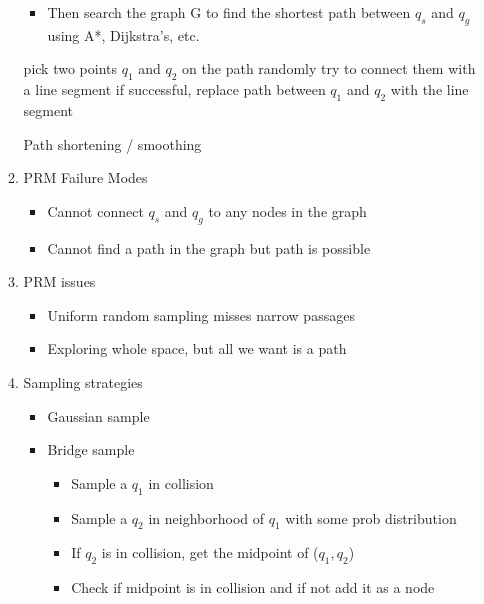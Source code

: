 \documentclass[../main.tex]{subfiles}
\begin{document}
\begin{itemize}
\begin{enumerate}
\begin{itemize}
                \item Then search the graph G to find the shortest path between $q_{s}$ and $q_{g}$ using A*, Dijkstra's, etc.
            \end{itemize}
            \begin{algorithm}[H]
                \SetAlgoLined
                 {
                    pick two points $q_{1}$ and $q_{2}$ on the path randomly\;
                    try to connect them with a line segment\;
                    if successful, replace path between $q_{1}$ and $q_{2}$ with the line segment\;
                }
                \caption{Path shortening / smoothing}
            \end{algorithm}
            \item PRM Failure Modes
            \begin{itemize}
                \item Cannot connect $q_{s}$ and $q_{g}$ to any nodes in the graph
                \item Cannot find a path in the graph but path is possible
            \end{itemize}
            \item PRM issues
            \begin{itemize}
                \item Uniform random sampling misses narrow passages
                \item Exploring whole space, but all we want is a path
            \end{itemize}
            \item Sampling strategies
            \begin{itemize}
                \item Gaussian sample
                \item Bridge sample
                \begin{itemize}
                    \item Sample a $q_{1}$ in collision
                    \item Sample a $q_{2}$ in neighborhood of $q_{1}$ with some prob distribution
                    \item If $q_{2}$ is in collision, get the midpoint of ($q_{1}, q_{2}$)
                    \item Check if midpoint is in collision and if not add it as a node
                \end{itemize}
            \end{itemize}

\end{enumerate}
\end{itemize}
\end{document}

